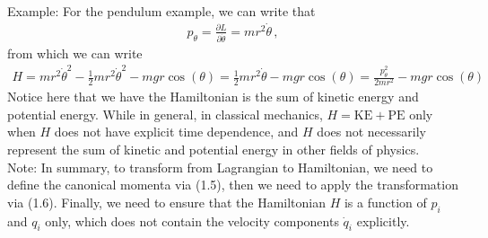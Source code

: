 \documentclass[11pt, onesided]{book}
\theoremstyle{break}
\theoremstyle{break}
\newcommand{\pd}{\partial}
\newcommand{\note}{\color{red}Note: \color{black}}
\newcommand{\example}{\color{green}Example: \color{black}}
\begin{document}
\example For the pendulum example, we can write that 
\begin{align*}
p_\theta = \frac{\pd L}{\pd \dot{\theta}} = mr^2 \dot{\theta}\,,
\end{align*}
from which we can write
\begin{align*}
H = mr^2 \dot{\theta}^2 - \frac{1}{2}mr^2 \dot{\theta}^2 - mgr\cos(\theta) = \frac{1}{2}mr^2 \dot{\theta} - mgr \cos(\theta) = \frac{p_\theta^2}{2mr^2}-mgr \cos(\theta)
\end{align*}
Notice here that we have the Hamiltonian is the sum of kinetic energy and potential energy. While in general, in classical mechanics, $H = \text{KE} + \text{PE}$ only when $H$ does not have explicit time dependence, and $H$ does not necessarily represent the sum of kinetic and potential energy in other fields of physics.\\


\note In summary, to transform from Lagrangian to Hamiltonian, we need to define the canonical momenta via (1.5), then we need to apply the transformation via (1.6). Finally, we need to ensure that the Hamiltonian $H$ is a function of $p_i$ and $q_i$ only, which does not contain the velocity components $\dot{q}_i$ explicitly. \\
\end{document}
